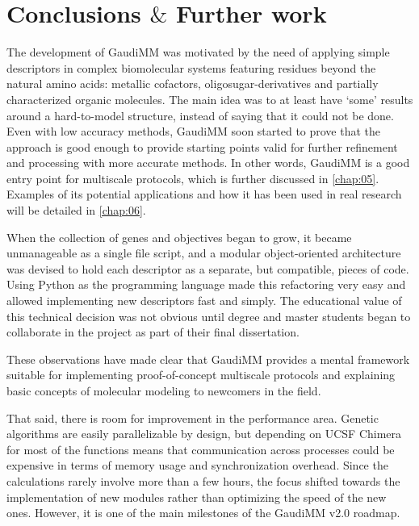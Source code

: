 \section{Conclusions $\&$  Further work}
The development of GaudiMM was motivated by the need of applying simple descriptors in complex biomolecular systems featuring residues beyond the natural amino acids: metallic cofactors, oligosugar-derivatives and partially characterized organic molecules. The main idea was to at least have ‘some’ results around a hard-to-model structure, instead of saying that it could not be done. Even with low accuracy methods, GaudiMM soon started to prove that the approach is good enough to provide starting points valid for further refinement and processing with more accurate methods. In other words, GaudiMM is a good entry point for multiscale protocols, which is further discussed in \autoref{chap:05}. Examples of its potential applications and how it has been used in real research will be detailed in \autoref{chap:06}.

When the collection of genes and objectives began to grow, it became unmanageable as a single file script, and a modular object-oriented architecture was devised to hold each descriptor as a separate, but compatible, pieces of code. Using Python as the programming language made this refactoring very easy and allowed implementing new descriptors fast and simply. The educational value of this technical decision was not obvious until degree and master students began to collaborate in the project as part of their final dissertation.

These observations have made clear that GaudiMM provides a mental framework suitable for implementing proof-of-concept multiscale protocols and explaining basic concepts of molecular modeling to newcomers in the field.

That said, there is room for improvement in the performance area. Genetic algorithms are easily parallelizable by design, but depending on UCSF Chimera for most of the functions means that communication across processes could be expensive in terms of memory usage and synchronization overhead. Since the calculations rarely involve more than a few hours, the focus shifted towards the implementation of new modules rather than optimizing the speed of the new ones. However, it is one of the main milestones of the GaudiMM v2.0 roadmap.
